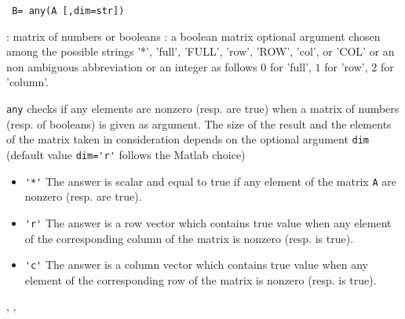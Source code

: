 \begin{mandesc}
\end{mandesc}
\begin{calling_sequence}
\begin{verbatim}
 B= any(A [,dim=str])
\end{verbatim}
\end{calling_sequence}
\begin{parameters}
  \begin{varlist}
    :  matrix of numbers or booleans 
     : a boolean matrix 
     optional argument chosen among the possible strings '*', 
    'full', 'FULL', 'row', 'ROW', 'col', or 'COL'  or an non ambiguous abbreviation or an 
    integer as follows $0$ for 'full', $1$ for 'row', $2$ for 'column'.
  \end{varlist}
\end{parameters}

\begin{mandescription}
  \verb!any! checks if any elements are nonzero (resp. are true) when a matrix of numbers (resp. of booleans) 
  is given as argument. The size of the result and the elements of the matrix taken in consideration depends 
  on the optional argument \verb!dim! (default value \verb!dim='r'! follows the Matlab choice)
  \begin{itemize}
  \item \verb!'*'! The answer is scalar and equal to true if any element of the matrix \verb!A!
    are nonzero (resp. are true).
  \item \verb!'r'! The answer is a row vector which contains true value when any element of 
    the corresponding column of the matrix is nonzero (resp. is true). 
  \item \verb!'c'! The answer is a column vector which contains true value when any element of 
    the corresponding row of the matrix is nonzero (resp. is true).
  \end{itemize}
\end{mandescription}
\begin{manseealso}
  , , 
\end{manseealso}

